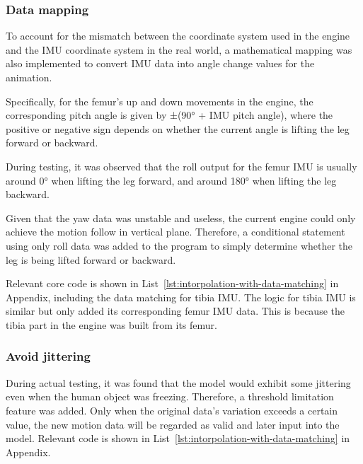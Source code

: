 \subsubsection{Data mapping}
To account for the mismatch between the coordinate system used in the engine and the IMU coordinate system in the real world, a mathematical mapping was also implemented to convert IMU data into angle change values for the animation.

Specifically, for the femur's up and down movements in the engine, the corresponding pitch angle is given by ±(90° + IMU pitch angle), where the positive or negative sign depends on whether the current angle is lifting the leg forward or backward.

During testing, it was observed that the roll output for the femur IMU is usually around 0° when lifting the leg forward, and around 180° when lifting the leg backward.

Given that the yaw data was unstable and useless, the current engine could only achieve the motion follow in vertical plane.
Therefore, a conditional statement using only roll data was added to the program to simply determine whether the leg is being lifted forward or backward.

Relevant core code is shown in List~\ref{lst:intorpolation-with-data-matching} in Appendix, including the data matching for tibia IMU\@.
The logic for tibia IMU is similar but only added its corresponding femur IMU data.
This is because the tibia part in the engine was built from its femur.


\subsubsection{Avoid jittering}
During actual testing, it was found that the model would exhibit some jittering even when the human object was freezing.
Therefore, a threshold limitation feature was added.
Only when the original data's variation exceeds a certain value, the new motion data will be regarded as valid and later input into the model.
Relevant code is shown in List~\ref{lst:intorpolation-with-data-matching} in Appendix.



